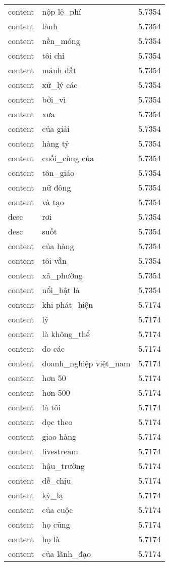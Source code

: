 \documentclass{article}
\begin{document}
\begin{tabular}{lll}
content & nộp lệ\_phí & 5.7354\\
content & lành & 5.7354\\
content & nền\_móng & 5.7354\\
content & tôi chỉ & 5.7354\\
content & mảnh đất & 5.7354\\
content & xử\_lý các & 5.7354\\
content & bởi\_vì & 5.7354\\
content & xưa & 5.7354\\
content & của giải & 5.7354\\
content & hàng tỷ & 5.7354\\
content & cuối\_cùng của & 5.7354\\
content & tôn\_giáo & 5.7354\\
content & nữ đông & 5.7354\\
content & và tạo & 5.7354\\
desc & rơi & 5.7354\\
desc & suốt & 5.7354\\
content & của hàng & 5.7354\\
content & tôi vẫn & 5.7354\\
content & xã\_phường & 5.7354\\
content & nổi\_bật là & 5.7354\\
content & khi phát\_hiện & 5.7174\\
content & lý & 5.7174\\
content & là không\_thể & 5.7174\\
content & do các & 5.7174\\
content & doanh\_nghiệp việt\_nam & 5.7174\\
content & hơn 50 & 5.7174\\
content & hơn 500 & 5.7174\\
content & là tôi & 5.7174\\
content & dọc theo & 5.7174\\
content & giao hàng & 5.7174\\
content & livestream & 5.7174\\
content & hậu\_trường & 5.7174\\
content & dễ\_chịu & 5.7174\\
content & kỳ\_lạ & 5.7174\\
content & của cuộc & 5.7174\\
content & họ cũng & 5.7174\\
content & họ là & 5.7174\\
content & của lãnh\_đạo & 5.7174\\

\end{tabular}
\end{document}
